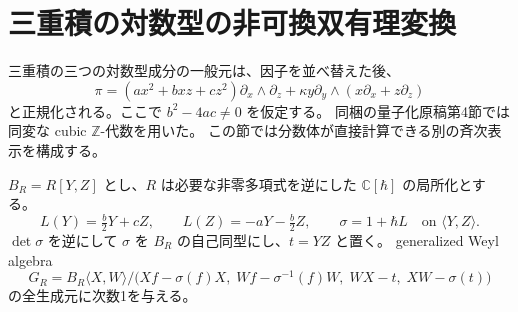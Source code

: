 \section{三重積の対数型の非可換双有理変換}
\label{sec:cube-log}

三重積の三つの対数型成分の一般元は、因子を並べ替えた後、
\[
 \pi=(a x^2+b xz+c z^2)\partial_x\wedge\partial_z
       +\kappa y\partial_y\wedge(x\partial_x+z\partial_z)
\]
と正規化される。ここで $b^2-4ac\ne0$ を仮定する。
同梱の量子化原稿第4節では同変な cubic $\mathbb Z$-代数を用いた。
この節では分数体が直接計算できる別の斉次表示を構成する。

$B_R=R[Y,Z]$ とし、$R$ は必要な非零多項式を逆にした
$\mathbb C[\hbar]$ の局所化とする。
\[
 L(Y)=\tfrac b2Y+cZ,\qquad
 L(Z)=-aY-\tfrac b2Z,\qquad
 \sigma=1+\hbar L\quad\text{on }\langle Y,Z\rangle.
\]
$\det\sigma$ を逆にして $\sigma$ を $B_R$ の自己同型にし、$t=YZ$ と置く。
generalized Weyl algebra
\[
 G_R=B_R\langle X,W\rangle/
 \bigl(Xf-\sigma(f)X,\;Wf-\sigma^{-1}(f)W,\;
       WX-t,\;XW-\sigma(t)\bigr)
\]
の全生成元に次数1を与える。

